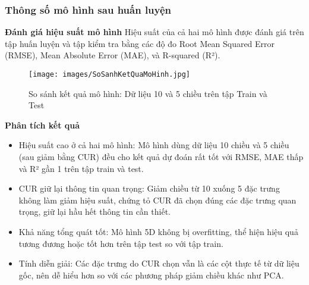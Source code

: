 \documentclass[conference]{IEEEtran}
\begin{document}
\subsubsection{Thông số mô hình sau huấn luyện}

\textbf{Đánh giá hiệu suất mô hình}
Hiệu suất của cả hai mô hình được đánh giá trên tập huấn luyện và tập kiểm tra bằng các độ đo Root Mean Squared Error (RMSE), Mean Absolute Error (MAE), và R-squared (R²).
\begin{figure}
    \centering
    \texttt{[image: images/SoSanhKetQuaMoHinh.jpg]}
    \caption{So sánh kết quả mô hình: Dữ liệu 10 và 5 chiều trên tập Train và Test}
    \label{fig:enter-label}
\end{figure}
\textbf{Phân tích kết quả}
\begin{itemize}
    \item Hiệu suất cao ở cả hai mô hình: Mô hình dùng dữ liệu 10 chiều và 5 chiều (sau giảm bằng CUR) đều cho kết quả dự đoán rất tốt với RMSE, MAE thấp và R² gần 1 trên tập train và test.
    \item CUR giữ lại thông tin quan trọng: Giảm chiều từ 10 xuống 5 đặc trưng không làm giảm hiệu suất, chứng tỏ CUR đã chọn đúng các đặc trưng quan trọng, giữ lại hầu hết thông tin cần thiết.
    \item Khả năng tổng quát tốt: Mô hình 5D không bị overfitting, thể hiện hiệu quả tương đương hoặc tốt hơn trên tập test so với tập train.
    \item Tính diễn giải: Các đặc trưng do CUR chọn vẫn là các cột thực tế từ dữ liệu gốc, nên dễ hiểu hơn so với các phương pháp giảm chiều khác như PCA.
\end{itemize}
\end{document}
